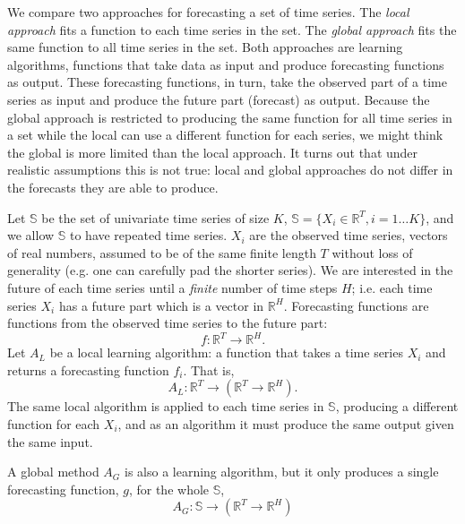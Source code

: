 \documentclass[a4paper]{article}
\theoremstyle{custom}
\begin{document}
We compare two approaches for forecasting a set of time series. The \textit{local approach} fits a function to each time series in the set. The \textit{global approach} fits the same function to all time series in the set. Both approaches are learning algorithms, functions that take data as input and produce forecasting functions as output. These forecasting functions, in turn, take the observed part of a time series as input and produce the future part (forecast) as output.
Because the global approach is restricted to producing the same function for all time series in a set while the local can use a different function for each series, we might think the global is more limited than the local approach. It turns out that under realistic assumptions this is not true: local and global approaches do not differ in the forecasts they are able to produce.

Let $\mathbb{S}$ be the set of univariate time series of size $K$, $\mathbb{S}=\{ X_i \in \mathbb{R}^T, i =1 \dots K \}$, and we allow $\mathbb{S}$ to have repeated time series.  $X_i$ are the observed time series, vectors of real numbers, assumed to be of the same finite length $T$ without loss of generality (e.g. one can carefully pad the shorter series). We are interested in the future of each time series until a \textit{finite} number of time steps $H$; i.e. each time series $X_i$ has a future part which is a vector in $\mathbb{R}^H$.
Forecasting functions are functions from the observed time series to the future part:
$$
  f: \mathbb{R}^T \to \mathbb{R}^H.
$$
Let $A_L$ be a local learning algorithm: a function that takes a time series $X_i$ and returns a forecasting function $f_i$.
That is,
$$
  A_L: \mathbb{R}^T \to (\mathbb{R}^T \to \mathbb{R}^H).
$$
The same local algorithm is applied to each time series in $\mathbb{S}$, producing a different function for each $X_i$, and as an algorithm it must produce the same output given the same input.

A global method $A_G$ is also a learning algorithm, but it only produces a single forecasting function, $g$, for the whole $\mathbb{S}$,
$$A_G: \mathbb{S} \to (\mathbb{R}^T \to \mathbb{R}^H)$$
\end{document}
